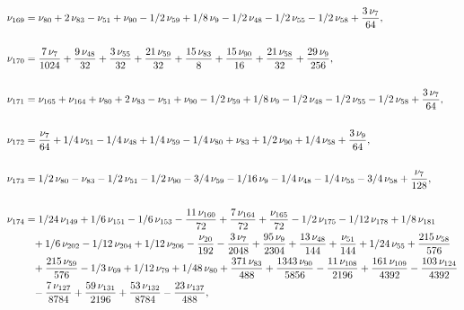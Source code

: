 \documentclass[a4paper,12pt, DIV=14, BCOR=5mm, twoside, headsepline]{scrbook}
\begin{document}
\begin{align}\label{AreaSol15}
\begin{aligned}
\nu_{{169}}&=\nu_{{80}}+2\,\nu_{{83}}-\nu_{{51}}+\nu_{{90}}-1/2\,\nu
_{{59}}+1/8\,\nu_{{9}}-1/2\,\nu_{{48}}-1/2\,\nu_{{55}}-1/2\,\nu_{{58}}
+{\frac {3\,\nu_{{7}}}{64}}, \\
\\
\nu_{{170}}&={\frac {7\,\nu_{{7}}}{1024}}+{
\frac {9\,\nu_{{48}}}{32}}+{\frac {3\,\nu_{{55}}}{32}}+{\frac {21\,\nu
_{{59}}}{32}}+{\frac {15\,\nu_{{83}}}{8}}+{\frac {15\,\nu_{{90}}}{16}}
+{\frac {21\,\nu_{{58}}}{32}}+{\frac {29\,\nu_{{9}}}{256}}, \\
\\
\nu_{{171}}
&=\nu_{{165}}+\nu_{{164}}+\nu_{{80}}+2\,\nu_{{83}}-\nu_{{51}}+\nu_{{90}
}-1/2\,\nu_{{59}}+1/8\,\nu_{{9}}-1/2\,\nu_{{48}}-1/2\,\nu_{{55}}-1/2\,
\nu_{{58}}+{\frac {3\,\nu_{{7}}}{64}}, \\
\\
\nu_{{172}}&={\frac {\nu_{{7}}}{
64}}+1/4\,\nu_{{51}}-1/4\,\nu_{{48}}+1/4\,\nu_{{59}}-1/4\,\nu_{{80}}+
\nu_{{83}}+1/2\,\nu_{{90}}+1/4\,\nu_{{58}}+{\frac {3\,\nu_{{9}}}{64}},\\
\\
\nu_{{173}}&=1/2\,\nu_{{80}}-\nu_{{83}}-1/2\,\nu_{{51}}-1/2\,\nu_{{90}}
-3/4\,\nu_{{59}}-1/16\,\nu_{{9}}-1/4\,\nu_{{48}}-1/4\,\nu_{{55}}-3/4\,
\nu_{{58}}+{\frac {\nu_{{7}}}{128}}, \\
\\
\nu_{{174}}&=1/24\,\nu_{{149}}+1/6
\,\nu_{{151}}-1/6\,\nu_{{153}}-{\frac {11\,\nu_{{160}}}{72}}+{\frac {7
\,\nu_{{164}}}{72}}+{\frac {\nu_{{165}}}{72}}-1/2\,\nu_{{175}}-1/12\,
\nu_{{178}}+1/8\,\nu_{{181}}\\
 &\hphantom{=}+1/6\,\nu_{{202}}-1/12\,\nu_{{204}}+1/12\,
\nu_{{206}}-{\frac {\nu_{{20}}}{192}}-{\frac {3\,\nu_{{7}}}{2048}}+{
\frac {95\,\nu_{{9}}}{2304}}+{\frac {13\,\nu_{{48}}}{144}}+{\frac {\nu
_{{51}}}{144}}+1/24\,\nu_{{55}}+{\frac {215\,\nu_{{58}}}{576}}\\
 &\hphantom{=}+{\frac 
{215\,\nu_{{59}}}{576}}-1/3\,\nu_{{69}}+1/12\,\nu_{{79}}+1/48\,\nu_{{
80}}+{\frac {371\,\nu_{{83}}}{488}}+{\frac {1343\,\nu_{{90}}}{5856}}-{
\frac {11\,\nu_{{108}}}{2196}}+{\frac {161\,\nu_{{109}}}{4392}}-{
\frac {103\,\nu_{{124}}}{4392}}\\
 &\hphantom{=}-{\frac {7\,\nu_{{127}}}{8784}}+{\frac 
{59\,\nu_{{131}}}{2196}}+{\frac {53\,\nu_{{132}}}{8784}}-{\frac {23\,
\nu_{{137}}}{488}}, \\
\\

\end{aligned}
\end{align}
\end{document}
